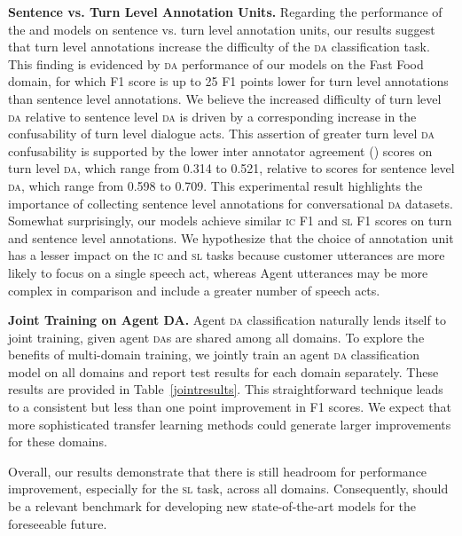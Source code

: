 \textbf{Sentence vs. Turn Level Annotation Units.}
Regarding the performance of the \lstm{} and \elmo{} models on sentence vs. turn level annotation units, our results suggest that turn level annotations increase the difficulty of the \textsc{da} classification task. This finding is evidenced by \textsc{da} performance of our models on the Fast Food domain, for which F1 score is up to 25 F1 points lower for turn level annotations than sentence level annotations. We believe the increased difficulty of turn level \textsc{da} relative to sentence level \textsc{da} is driven by a corresponding increase in the confusability of turn level dialogue acts. This assertion of greater turn level \textsc{da} confusability is supported by the lower inter annotator agreement () scores on turn level \textsc{da}, which range from 0.314 to 0.521, relative to  scores for sentence level \textsc{da}, which range from 0.598 to 0.709.  This experimental result highlights the importance of collecting sentence level annotations for conversational \textsc{da} datasets. Somewhat surprisingly, our models achieve similar \textsc{ic} F1 and \textsc{sl} F1 scores on turn and sentence level annotations. We hypothesize that the choice of annotation unit has a lesser impact on the \textsc{ic} and \textsc{sl} tasks because customer utterances are more likely to focus on a single speech act, whereas Agent utterances may be more complex in comparison and include a greater number of speech acts. 

	\textbf{Joint Training on Agent DA.} Agent \textsc{da} classification naturally lends itself to joint training, given agent \textsc{da}s are shared among all domains. To explore the benefits of multi-domain training, we jointly train an agent \textsc{da} classification model on all domains and report test results for each domain separately. These results are provided in Table~\ref{jointresults}. This straightforward technique leads to a consistent but less than one point improvement in F1 scores. We expect that more sophisticated transfer learning methods \citep{liu2017adversarial, howard2018universal} could generate larger improvements for these domains. 

Overall, our results demonstrate that there is still headroom for performance improvement, especially for the \textsc{sl} task, across all domains. Consequently, \multidogo should be a relevant benchmark for developing new state-of-the-art  models for the foreseeable future.  
